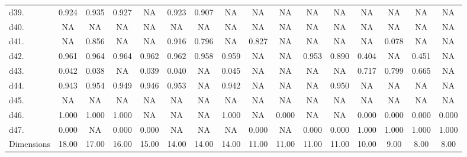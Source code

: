 \begin{table}
\begin{tabular}{lccccccccccccccc}
d39. & 0.924 & 0.935 & 0.927 & NA    & 0.923 & 0.907 & NA    & NA    & NA    & NA    & NA    & NA    & NA    & NA    & NA \\
d40. & NA    & NA    & NA    & NA    & NA    & NA    & NA    & NA    & NA    & NA    & NA    & NA    & NA    & NA    & NA \\
d41. & NA    & 0.856 & NA    & NA    & 0.916 & 0.796 & NA    & 0.827 & NA    & NA    & NA    & NA    & 0.078 & NA    & NA \\
d42. & 0.961 & 0.964 & 0.964 & 0.962 & 0.962 & 0.958 & 0.959 & NA    & NA    & 0.953 & 0.890 & 0.404 & NA    & 0.451 & NA \\
d43. & 0.042 & 0.038 & NA    & 0.039 & 0.040 & NA    & 0.045 & NA    & NA    & NA    & NA    & 0.717 & 0.799 & 0.665 & NA \\
d44. & 0.943 & 0.954 & 0.949 & 0.946 & 0.953 & NA    & 0.942 & NA    & NA    & NA    & 0.950 & NA    & NA    & NA    & NA \\
d45. & NA    & NA    & NA    & NA    & NA    & NA    & NA    & NA    & NA    & NA    & NA    & NA    & NA    & NA    & NA \\
d46. & 1.000 & 1.000 & 1.000 & NA    & NA    & NA    & 1.000 & NA    & 0.000 & NA    & NA    & 0.000 & 0.000 & 0.000 & 0.000 \\
d47. & 0.000 & NA    & 0.000 & 0.000 & NA    & NA    & NA    & 0.000 & NA    & 0.000 & 0.000 & 1.000 & 1.000 & 1.000 & 1.000 \\
\bottomrule Dimensions & 18.00 & 17.00 & 16.00 & 15.00 & 14.00 & 14.00 & 14.00 & 11.00 & 11.00 & 11.00 & 11.00 & 10.00 & 9.00  & 8.00  & 8.00 \\
\end{tabular}%
\end{table}%

